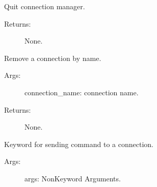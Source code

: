 \documentclass[letterpaper,10pt,english]{sphinxmanual}
\begin{document}
\begin{fulllineitems}
\begin{fulllineitems}
\end{fulllineitems}


\begin{fulllineitems}
\label{\detokenize{QConnectBase:QConnectBase.connection_manager.ConnectionManager.quit}}
\sphinxAtStartPar
Quit connection manager.
\begin{description}
\item[{Returns:}] \leavevmode
\sphinxAtStartPar
None.

\end{description}

\end{fulllineitems}


\begin{fulllineitems}
\label{\detokenize{QConnectBase:QConnectBase.connection_manager.ConnectionManager.remove_connection}}
\sphinxAtStartPar
Remove a connection by name.
\begin{description}
\item[{Args:}] \leavevmode
\sphinxAtStartPar
connection\_name: connection name.

\item[{Returns:}] \leavevmode
\sphinxAtStartPar
None.

\end{description}

\end{fulllineitems}


\begin{fulllineitems}
\label{\detokenize{QConnectBase:QConnectBase.connection_manager.ConnectionManager.send_command}}
\sphinxAtStartPar
Keyword for sending command to a connection.
\begin{description}
\item[{Args:}] \leavevmode
\sphinxAtStartPar
args:   Non\sphinxhyphen{}Keyword Arguments.


\end{description}
\end{fulllineitems}
\end{fulllineitems}
\end{document}
